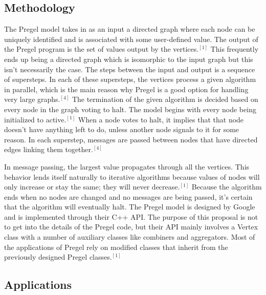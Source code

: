 \documentclass[conference]{IEEEtran}
\begin{document}
\subsection{Methodology}

The Pregel model takes in as an input a directed graph where each node can be uniquely identified and is associated with some user-defined value.  The output of the Pregel program is the set of values output by the vertices.$^{[1]}$  This frequently ends up being a directed graph which is isomorphic to the input graph but this isn't necessarily the case.  The steps between the input and output is a sequence of supersteps.  In each of these supersteps, the vertices process a given algorithm in parallel, which is the main reason why Pregel is a good option for handling very large graphs.$^{[4]}$  The termination of the given algorithm is decided based on every node in the graph voting to halt.  The model begins with every node being initialized to active.$^{[1]}$  When a node votes to halt, it implies that that node doesn't have anything left to do, unless another node signals to it for some reason.  In each superstep, messages are passed between nodes that have directed edges linking them together.$^{[4]}$

In message passing, the largest value propagates through all the vertices.  This behavior lends itself naturally to iterative algorithms because values of nodes will only increase or stay the same; they will never decrease.$^{[1]}$  Because the algorithm ends when no nodes are changed and no messages are being passed, it's certain that the algorithm will eventually halt.  The Pregel model is designed by Google and is implemented through their C++ API.  The purpose of this proposal is not to get into the details of the Pregel code, but their API mainly involves a Vertex class with a number of auxiliary classes like combiners and aggregators.  Most of the applications of Pregel rely on modified classes that inherit from the previously designed Pregel classes.$^{[1]}$  

\subsection{Applications}
\end{document}
